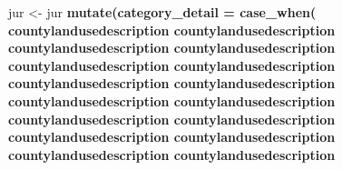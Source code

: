 \documentclass[]{article}
\newenvironment{Shaded}{\begin{snugshade}}{\end{snugshade}}
\newcommand{\KeywordTok}[1]{\textcolor[rgb]{0.13,0.29,0.53}{\textbf{#1}}}
\newcommand{\DataTypeTok}[1]{\textcolor[rgb]{0.13,0.29,0.53}{#1}}
\newcommand{\StringTok}[1]{\textcolor[rgb]{0.31,0.60,0.02}{#1}}
\newcommand{\OperatorTok}[1]{\textcolor[rgb]{0.81,0.36,0.00}{\textbf{#1}}}
\newcommand{\NormalTok}[1]{#1}
\begin{document}
\begin{Shaded}
\begin{Highlighting}[]
\NormalTok{jur <-}\StringTok{ }\NormalTok{jur }\OperatorTok{%>%}\StringTok{ }
\StringTok{  }\KeywordTok{mutate}\NormalTok{(}\DataTypeTok{category_detail =} \KeywordTok{case_when}\NormalTok{(}
\NormalTok{           countylandusedescription }\OperatorTok{%in%}\StringTok{ }\NormalTok{apartment }\OperatorTok{~}\StringTok{ "apartment"}\NormalTok{,}
\NormalTok{           countylandusedescription }\OperatorTok{%in%}\StringTok{ }\NormalTok{commercial }\OperatorTok{~}\StringTok{ "commercial"}\NormalTok{,}
\NormalTok{           countylandusedescription }\OperatorTok{%in%}\StringTok{ }\NormalTok{condo }\OperatorTok{~}\StringTok{ "condo"}\NormalTok{,}
\NormalTok{           countylandusedescription }\OperatorTok{%in%}\StringTok{ }\NormalTok{duplex }\OperatorTok{~}\StringTok{ "duplex"}\NormalTok{,}
\NormalTok{           countylandusedescription }\OperatorTok{%in%}\StringTok{ }\NormalTok{office }\OperatorTok{~}\StringTok{ "office"}\NormalTok{,}
\NormalTok{           countylandusedescription }\OperatorTok{%in%}\StringTok{ }\NormalTok{mfattached }\OperatorTok{~}\StringTok{ "mf attached"}\NormalTok{,}
\NormalTok{           countylandusedescription }\OperatorTok{%in%}\StringTok{ }\NormalTok{sfdetached }\OperatorTok{~}\StringTok{ "sf detached"}\NormalTok{,}
\NormalTok{           countylandusedescription }\OperatorTok{%in%}\StringTok{ }\NormalTok{trailer }\OperatorTok{~}\StringTok{ "trailer"}\NormalTok{,}
\NormalTok{           countylandusedescription }\OperatorTok{%in%}\StringTok{ }\NormalTok{townhouse }\OperatorTok{~}\StringTok{ "townhouse"}\NormalTok{,}
\NormalTok{           countylandusedescription }\OperatorTok{%in%}\StringTok{ }\NormalTok{educational }\OperatorTok{~}\StringTok{ "educational"}\NormalTok{,}
\NormalTok{           countylandusedescription }\OperatorTok{%in%}\StringTok{ }\NormalTok{firedepartment }\OperatorTok{~}\StringTok{ "fire department"}\NormalTok{,}
\NormalTok{           countylandusedescription }\OperatorTok{%in%}\StringTok{ }\NormalTok{recreational }\OperatorTok{~}\StringTok{ "recreational"}\NormalTok{,}
\NormalTok{           countylandusedescription }\OperatorTok{%in%}\StringTok{ }\NormalTok{govt }\OperatorTok{~}\StringTok{ "government"}\NormalTok{,}
\NormalTok{           countylandusedescription }\OperatorTok{%in%}\StringTok{ }\NormalTok{otheruse }\OperatorTok{~}\StringTok{ "other use"}\NormalTok{,}
\NormalTok{           countylandusedescription }\OperatorTok{%in%}\StringTok{ }\NormalTok{vacantcom }\OperatorTok{~}\StringTok{ "vacant commercial"}\NormalTok{,}
\NormalTok{           countylandusedescription }\OperatorTok{%in%}\StringTok{ }\NormalTok{vacantother }\OperatorTok{~}\StringTok{ "vacant other"}\NormalTok{,}
}}}}}}}}}}}}}}}}}
\end{Highlighting}
\end{Shaded}
\end{document}
